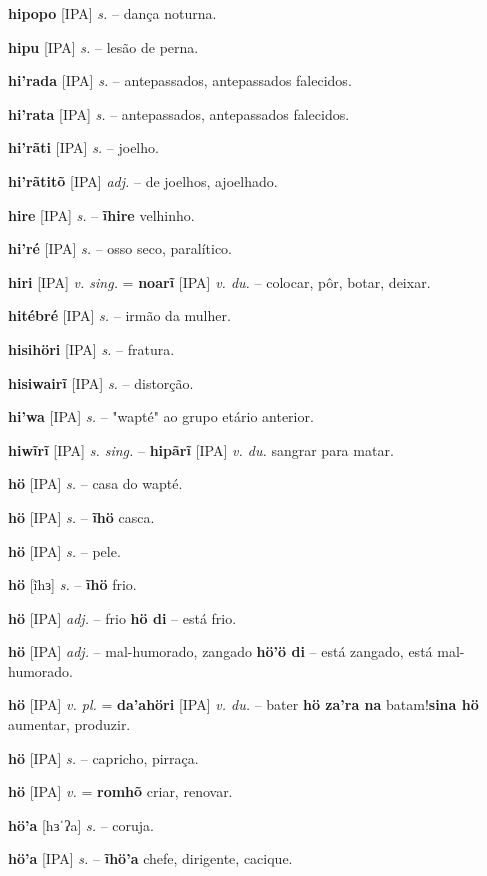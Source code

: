 \textbf{hipopo} [IPA] \textit{s.} -- dança noturna.

\textbf{hipu} [IPA] \textit{s.} -- lesão de perna.

\textbf{hi'rada} [IPA] \textit{s.} -- antepassados, antepassados falecidos.

\textbf{hi'rata} [IPA] \textit{s.} -- antepassados, antepassados falecidos.

\textbf{hi'rãti} [IPA] \textit{s.} -- joelho.

\textbf{hi'rãtitõ} [IPA] \textit{adj.} -- de joelhos, ajoelhado.

\textbf{hire} [IPA] \textit{s.} -- \textbf{ĩhire} velhinho.

\textbf{hi'ré} [IPA] \textit{s.} -- osso seco, paralítico.

\textbf{hiri} [IPA] \textit{v. sing.} = \textbf{noarĩ} [IPA] \textit{v. du.} -- colocar, pôr, botar, deixar.

\textbf{hitébré} [IPA] \textit{s.} -- irmão da mulher.

\textbf{hisihöri} [IPA] \textit{s.} -- fratura.

\textbf{hisiwairĩ} [IPA] \textit{s.} -- distorção.

\textbf{hi'wa} [IPA] \textit{s.} -- "wapté" ao grupo etário anterior.

\textbf{hiwĩrĩ} [IPA] \textit{s. sing.} -- \textbf{hipãrĩ} [IPA] \textit{v. du.} sangrar para matar.

\textbf{hö} [IPA] \textit{s.} -- casa do wapté.

\textbf{hö} [IPA] \textit{s.} -- \textbf{ĩhö} casca.

\textbf{hö} [IPA] \textit{s.} -- pele.

\textbf{hö} [ĩhɜ] \textit{s.} -- \textbf{ĩhö} frio.

\textbf{hö} [IPA] \textit{adj.} -- frio  \textbf{hö di} -- está frio.

\textbf{hö} [IPA] \textit{adj.} -- mal-humorado, zangado  \textbf{hö'ö di} -- está zangado, está mal-humorado.

\textbf{hö} [IPA] \textit{v. pl.} = \textbf{da'ahöri} [IPA] \textit{v. du.} -- bater  \textbf{hö za'ra na} batam!\textbf{sina hö} aumentar, produzir.

\textbf{hö} [IPA] \textit{s.} -- capricho, pirraça.

\textbf{hö} [IPA] \textit{v.} = \textbf{romhõ} criar, renovar.

\textbf{hö'a} [hɜˈʔa] \textit{s.} -- coruja.

\textbf{hö'a} [IPA] \textit{s.} -- \textbf{ĩhö'a} chefe, dirigente, cacique.

